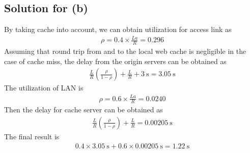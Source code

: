 \documentclass{scrartcl}
\newcommand{\un}[1]{\ensuremath{\ \mathrm{#1}}}
\begin{document}
\subsection{Solution for (b)}
By taking cache into account, we can obtain utilization for access link as
\begin{align*} 
  \rho = 0.4 \times \frac{La}{R} = 0.296
\end{align*}
Assuming that round trip from and to the local web cache is negligible in the
case of cache miss, the delay from the origin servers can be obtained as
\begin{align*}
  \frac{L}{R} \left( \frac{\rho}{1 - \rho} \right) + \frac{L}{R} + 3 \un{s}
  = 3.05 \un{s}
\end{align*}
The utilization of LAN is
\begin{align*}
  \rho = 0.6 \times \frac{La}{R} = 0.0240
\end{align*}
Then the delay for cache server can be obtained as
\begin{align*}
  \frac{L}{R} \left( \frac{\rho}{1 - \rho} \right) + \frac{L}{R}
  = 0.00205 \un{s}
\end{align*}
The final result is
\begin{align*}
  0.4 \times 3.05 \un{s} + 0.6 \times 0.00205 \un{s} = 1.22 \un{s}
\end{align*}
\end{document}
